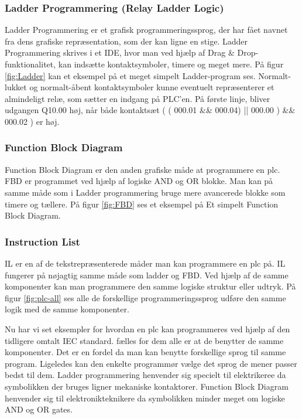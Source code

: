 
\subsubsection{Ladder Programmering (Relay Ladder Logic)}
Ladder Programmering er et grafisk programmeringssprog, der har fået navnet fra dens grafiske repræsentation, som der kan ligne en stige. Ladder Programmering skrives i et IDE, hvor man ved hjælp af Drag \& Drop-funktionalitet, kan indsætte kontaktsymboler, timere og meget mere. På figur \ref{fig:Ladder} kan et eksempel på et meget simpelt Ladder-program ses. Normalt-lukket og normalt-åbent kontaktsymboler kunne eventuelt repræsenterer et almindeligt relæ, som sætter en indgang på PLC'en. På første linje, bliver udgangen Q10.00 høj, når både kontaktsæt ( ( 000.01 \&\& 000.04) || 000.00 ) \&\& 000.02 ) er høj.


\subsubsection{Function Block Diagram}
Function Block Diagram er den anden grafiske måde at programmere en plc. FBD er programmet ved hjælp af logiske AND og OR blokke. Man kan på samme måde som i Ladder programmering bruge mere avancerede blokke som timere og tællere. På figur \ref{fig:FBD} ses et eksempel på Et simpelt Function Block Diagram.


\subsubsection{Instruction List}
IL er en af de tekstrepræsenterede måder man kan programmere en plc på. IL fungerer på nøjagtig samme måde som ladder og FBD. Ved hjælp af de samme komponenter kan man programmere den samme logiske struktur eller udtryk. På figur \ref{fig:plc-all} ses alle de forskellige programmeringssprog udføre den samme logik med de samme komponenter.


\noindent Nu har vi set eksempler for hvordan en plc kan programmeres ved hjælp af den tidligere omtalt IEC standard. fælles for dem alle er at de benytter de samme komponenter. Det er en fordel da man kan benytte forskellige sprog til samme program. Ligeledes kan den enkelte programmør vælge det sprog de mener passer bedst til dem. Ladder programmering henvender sig specielt til elektrikeree da symbolikken der bruges ligner mekaniske kontaktorer. Function Block Diagram henvender sig til elektronikteknikere da symbolikken minder meget om logiske AND og OR gates.

